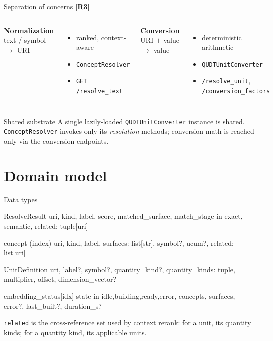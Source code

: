 \documentclass[aspectratio=169]{beamer}
\newcommand{\code}[1]{\texttt{\small #1}}
\newcommand{\req}[1]{\textbf{[#1]}}
\begin{document}
\begin{frame}{Separation of concerns \req{R3}}
  \begin{columns}[T]
    \textbf{Normalization}\\[2pt]
    text / symbol $\rightarrow$ URI
    \begin{itemize}
      \item ranked, context-aware
      \item \code{ConceptResolver}
      \item \code{GET /resolve\_text}
    \end{itemize}
    \textbf{Conversion}\\[2pt]
    URI $+$ value $\rightarrow$ value
    \begin{itemize}
      \item deterministic arithmetic
      \item \code{QUDTUnitConverter}
      \item \code{/resolve\_unit},
            \code{/conversion\_factors}
    \end{itemize}
  \end{columns}
  \vspace{6pt}
  \begin{block}{Shared substrate}
    A single lazily-loaded \code{QUDTUnitConverter} instance is shared.
    \code{ConceptResolver} invokes only its \emph{resolution} methods;
    conversion math is reached only via the conversion endpoints.
  \end{block}
\end{frame}

\section{Domain model}

\begin{frame}[fragile]{Data types}
  \begin{semiverbatim}\scriptsize
ResolveResult   uri, kind, label, score, matched_surface,
                match_stage in {exact, semantic}, related: tuple[uri]

concept (index) uri, kind, label, surfaces: list[str],
                symbol?, ucum?, related: list[uri]

UnitDefinition  uri, label?, symbol?, quantity_kind?,
                quantity_kinds: tuple, multiplier, offset,
                dimension_vector?

embedding_status[idx]  state in {idle,building,ready,error},
                concepts, surfaces, error?, last_built?, duration_s?
  \end{semiverbatim}
  \code{related} is the cross-reference set used by context rerank:
  for a unit, its quantity kinds; for a quantity kind, its applicable
  units.
\end{frame}
\end{document}
